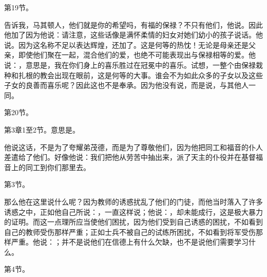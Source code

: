 第19节。\par

告诉我，马其顿人，他们就是你的希望吗，有福的保禄？不只有他们，他说。因此他加了因为他说：请注意，这些话像是满怀柔情的妇女对她们幼小的孩子说话。他说。因为这名称不足以表达辉煌，还加了。这是何等的热忱！无论是母亲还是父亲，即使他们聚在一起，混合他们的爱，也绝不可能表现出与保禄相等的爱。他说：，意思是，我在你们身上的喜乐胜过在冠冕中的喜乐。试想，一整个由保禄栽种和扎根的教会出现在眼前，这是何等的大事。谁会不为如此众多的子女以及这些子女的良善而喜乐呢？因此这也不是奉承。因为他没有说，而是说，与其他人一同。\par

第20节。\par

第3章1至2节。意思是。\par

他说这话，不是为了夸耀弟茂德，而是为了尊敬他们，因为他把同工和福音的仆人差遣给了他们。好像他说：我们把他从劳苦中抽出来，派了天主的仆役并在基督福音上的同工到你们那里去。\par

\par

第3节。\par

那么他在这里说什么呢？因为教师的诱惑扰乱了他们的门徒，而他当时落入了许多诱惑之中，正如他自己所说：，一直这样说；他说：，却未能成行，这是极大暴力的证明。而这一点理所应当使他们困扰，因为他们受到自己诱惑的困扰，不如看到自己的教师受伤那样严重；正如士兵不被自己的试练所困扰，不如看到将军受伤那样严重。他说：；并不是说他们在信德上有什么欠缺，也不是说他们需要学习什么。\par

\par

第4节。\par


